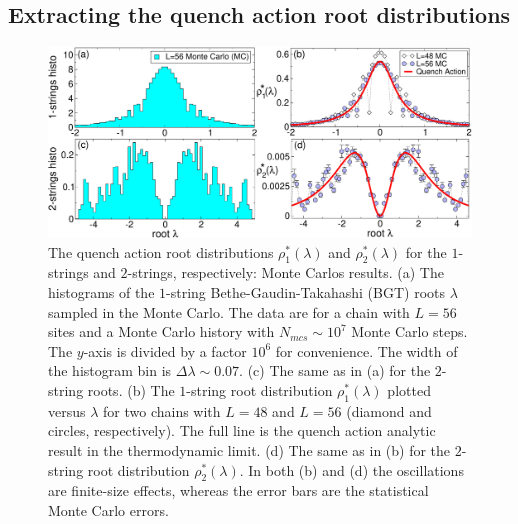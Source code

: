 \documentclass[11pt]{iopart}
\begin{document}
\subsection{Extracting the quench action root distributions}
\label{sec:6.3}

\begin{figure}[t]
\begin{center}
\includegraphics[width=.95\textwidth]{./draft_figs/Neel_rho}
\end{center}
\caption{ The quench action root distributions $\rho^*_1(\lambda)$ and 
 $\rho^*_2(\lambda)$ for the $1$-strings and $2$-strings, respectively: Monte 
 Carlos results. (a) The histograms of the $1$-string Bethe-Gaudin-Takahashi 
 (BGT) roots $\lambda$ sampled in the Monte Carlo. The data are for a chain 
 with $L=56$ sites and a Monte Carlo history with $N_{mcs}\sim 10^7$ Monte 
 Carlo steps. The $y$-axis is divided by a factor $10^6$ for convenience. 
 The width of the histogram bin is $\Delta\lambda\sim 0.07$. (c) The same as 
 in (a) for the $2$-string roots. (b) The $1$-string root distribution 
 $\rho^*_1(\lambda)$ plotted versus $\lambda$ for two chains with $L=48$ 
 and $L=56$ (diamond and circles, respectively). The full line 
 is the quench action analytic result in the thermodynamic limit. (d) 
 The same as in (b) for the $2$-string root distribution $\rho^*_2(\lambda)$. 
 In both (b) and (d) the oscillations are finite-size effects, whereas 
 the error bars are the statistical Monte Carlo errors. 
}
\label{fig4:neel-rho}
\end{figure}
\end{document}
